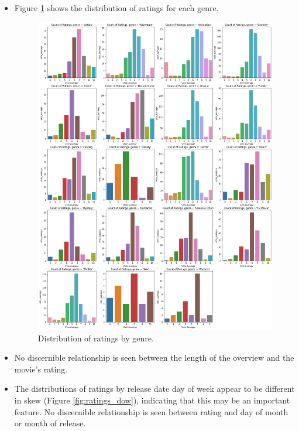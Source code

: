 \documentclass[12pt, oneside]{article}   	%
\begin{document}
\begin{itemize}
\item Figure \ref{fig:ratings_by_genre} shows the distribution of ratings for each genre.

\begin{figure}[H]
\includegraphics[height=0.9\textheight]{ratings_by_genre}
\caption{\label{fig:ratings_by_genre}Distribution of ratings by genre.}
\end{figure}

\item No discernible relationship is seen between the length of the overview and the movie's rating.

\item The distributions of ratings by release date day of week appear to be different in skew (Figure \ref{fig:ratings_dow}), indicating that this may be an important feature. No discernible relationship is seen between rating and day of month or month of release.


\end{itemize}
\end{document}
